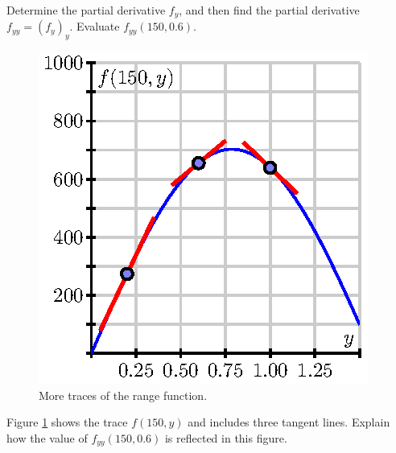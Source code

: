 \begin{pa}

  \item Determine the partial derivative $f_y$, and then find the partial
    derivative $f_{yy}=(f_y)_y$.  Evaluate $f_{yy}(150, 0.6)$.


  \begin{figure}[ht]
    \begin{center}
      \includegraphics{figures/fig_10_3_preview_yy.eps}
    \end{center}
    \caption{More traces of the range function.}
    \label{F:10.3.preview.y}
  \end{figure}

  \item Figure \ref{F:10.3.preview.y} shows the
    trace $f(150, y)$ and includes three tangent lines.
    Explain how the value of $f_{yy}(150,0.6)$ is reflected in this figure.  


\end{pa}

